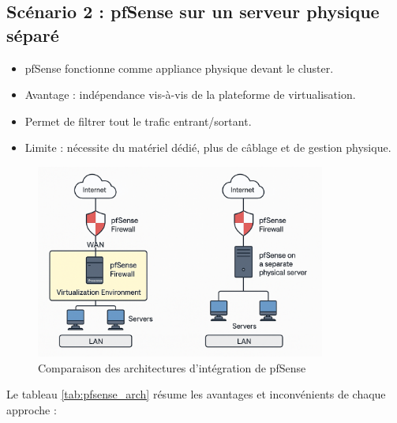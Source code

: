 \subsection{Scénario 2 : pfSense sur un serveur physique séparé}

\begin{itemize}
	\item pfSense fonctionne comme appliance physique devant le cluster.
	\item Avantage : indépendance vis-à-vis de la plateforme de virtualisation.
	\item Permet de filtrer tout le trafic entrant/sortant.
	\item Limite : nécessite du matériel dédié, plus de câblage et de gestion physique.
\end{itemize}

\begin{figure}[H]
	\centering
	\includegraphics[width=0.85\textwidth]{figures/choix implementation pfsense.png}
	\caption{Comparaison des architectures d'intégration de pfSense}
\end{figure}

Le tableau \ref{tab:pfsense_arch} résume les avantages et inconvénients de chaque approche :

